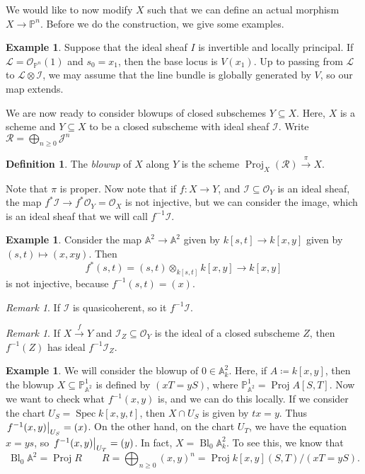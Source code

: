 \documentclass[leqno, openany]{memoir}
\theoremstyle{definition}
\newtheorem{defn}[thm]{Definition}
\newtheorem{exm}[thm]{Example}
\theoremstyle{remark}
\newtheorem{rmk}[thm]{Remark}
\theoremstyle{plain}
\theoremstyle{definition}
\theoremstyle{remark}
\newcommand{\A}{\mathbb{A}}
\renewcommand{\P}{\mathbb{P}}
\newcommand{\mc}[1]{\mathcal{#1}}
\DeclareMathOperator{\Spec}{Spec}
\DeclareMathOperator{\Proj}{Proj}
\DeclareMathOperator{\Bl}{Bl}
\begin{document}
We would like to now modify $X$ such that we can define an actual morphism $X \to \P^n$. Before we do the construction, we give some examples.

\begin{exm}
    Suppose that the ideal sheaf $I$ is invertible and locally principal. If $\mc{L} = \mc{O}_{\P^n}(1)$ and $s_0 = x_1$, then the base locus is $V(x_1)$. Up to passing from $\mc{L}$ to $\mc{L} \otimes \mc{I}$, we may assume that the line bundle is globally generated by $V$, so our map extends.
\end{exm}

We are now ready to consider blowups of closed subschemes $Y \subseteq X$. Here, $X$ is a scheme and $Y \subseteq X$ to be a closed subscheme with ideal sheaf $\mc{I}$. Write $\mc{R} = \bigoplus_{n \geq 0} \mc{J}^n$

\begin{defn}
    The \textit{blowup} of $X$ along $Y$ is the scheme $\Proj_X(\mc{R}) \xrightarrow{\pi} X$.
\end{defn}

Note that $\pi$ is proper. Now note that if $f \colon X \to Y$, and $\mc{I} \subseteq \mc{O}_Y$ is an ideal sheaf, the map $f^* \mc{I} \to f^* \mc{O}_Y = \mc{O}_X$ is not injective, but we can consider the image, which is an ideal sheaf that we will call $f^{-1}\mc{I}$.

\begin{exm}
    Consider the map $\A^2 \to \A^2$ given by $k[s,t] \to k[x,y]$ given by $(s,t) \mapsto (x, xy)$. Then
    \[ f^*(s,t) = (s,t) \otimes_{k[s,t]} k[x,y] \to k[x,y] \]
    is not injective, because $f^{-1}(s,t) = (x)$. 
\end{exm}

\begin{rmk}
    If $\mc{I}$ is quasicoherent, so it $f^{-1}\mc{I}$.
\end{rmk}

\begin{rmk}
    If $X \xrightarrow{f} Y$ and $\mc{I}_Z \subseteq \mc{O}_Y$ is the ideal of a closed subscheme $Z$, then $f^{-1}(Z)$ has ideal $f^{-1} \mc{I}_Z$.
\end{rmk}

\begin{exm}
    We will consider the blowup of $0 \in \A^2_k$. Here, if $A \coloneqq k[x,y]$, then the blowup $X \subseteq \P^1_{\A^2}$ is defined by $(xT = yS)$, where $\P^1_{\A^2} = \Proj A[S,T]$. Now we want to check what $f^{-1}(x,y)$ is, and we can do this locally. If we consider the chart $U_S = \Spec k[x,y,t]$, then $X \cap U_S$ is given by $tx = y$. Thus $\eval{ f^{-1}(x,y) }_{U_S} = (x)$. On the other hand, on the chart $U_T$, we have the equation $x = ys$, so $\eval{f^{-1}(x,y)}_{U_T} = (y)$. In fact, $X = \Bl_0 \A^2_k$. To see this, we know that
    \[ \Bl_0 \A^2 = \Proj R \qquad R = \bigoplus_{n \geq 0} {(x,y)}^n = \Proj k[x,y](S,T) / (xT = yS). \]
\end{exm}
\end{document}
